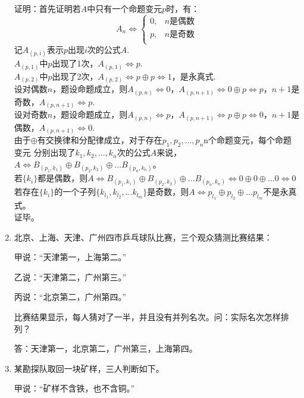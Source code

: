 \documentclass[UTF8]{ctexart}
\begin{document}
\begin{enumerate}
    证明：首先证明若$A$中只有一个命题变元$p$时，有：\\
    \[
        A_n\Leftrightarrow\begin{cases}
            0,&\text{$n$是偶数}\\
            p,&\text{$n$是奇数}\\
        \end{cases}
    \]
    记$A_{(p,i)}$表示$p$出现$i$次的公式$A$.\\
    $A_{(p,1)}$中$p$出现了1次，$A_{(p,1)}\Leftrightarrow p$.\\
    $A_{(p,2)}$中$p$出现了2次，$A_{(p,2)}\Leftrightarrow p\oplus p\Leftrightarrow 1$，是永真式.\\
    设对偶数$n$，题设命题成立，则$A_{(p,n)}\Leftrightarrow 0$，$A_{(p,n+1)}\Leftrightarrow 0\oplus p\Leftrightarrow p$，$n+1$是奇数，$A_{(p,n+1)}\Leftrightarrow p$.\\
    设对奇数$n$，题设命题成立，则$A_{(p,n)}\Leftrightarrow p$，$A_{(p,n+1)}\Leftrightarrow p\oplus p\Leftrightarrow 0$，$n+1$是偶数，$A_{(p,n+1)}\Leftrightarrow 0$.\\
    由于$\oplus$有交换律和分配律成立，对于存在$p_1,p_2,\dots,p_n$n个命题变元，每个命题变元
    分别出现了$k_1,k_2,\dots,k_n$次的公式$A$来说，$A\Leftrightarrow B_{(p_1,k_1)}\oplus B_{(p_2,k_2)} \oplus \dots B_{(p_n,k_n)}$。\\
    若$\{k_i\}$都是偶数，则$A\Leftrightarrow B_{(p_1,k_1)}\oplus B_{(p_2,k_2)} \oplus \dots B_{(p_n,k_n)}\Leftrightarrow 0\oplus 0\oplus \dots 0\Leftrightarrow 0$\\
    若存在$\{k_i\}$的一个子列$\{k_{l_1},k_{l_2},\dots k_{l_m}\}$是奇数，则$A\Leftrightarrow p_{l_1}\oplus p_{l_2}\oplus \dots p_{l_m}$不是永真式。\\
    证毕。
    \item 北京、上海、天津、广州四市乒乓球队比赛，三个观众猜测比赛结果：

    甲说：“天津第一，上海第二。”
    
    乙说：“天津第二，广州第三。”
    
    丙说：“北京第二，广州第四。”
    
    比赛结果显示，每人猜对了一半，并且没有并列名次。问：实际名次怎样排列？
    
    答：天津第一，北京第二，广州第三，上海第四。

    \item 某勘探队取回一块矿样，三人判断如下。

    甲说：“矿样不含铁，也不含铜。”
    

\end{enumerate}
\end{document}
